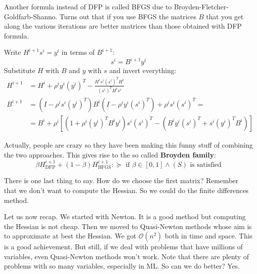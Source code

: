 \par Another formula instead of DFP is called BFGS due to Broyden-Fletcher-Goldfarb-Shanno. Turns out that if you use BFGS the matrices $B$ that you get along the various iterations are better matrices than those obtained with DFP formula.
\par Write $H^{i+1} s^i = y^i$ in terms of $B^{i+1}$:
\begin{equation}
    s^i = B^{i+1} y^i
\end{equation}
Substitute $H$ with $B$ and $y$ with $s$ and invert everything:
\begin{align}
    H^{i+1} &= H^i + \rho^i y^i (y^i)^T - \frac{H^i s^i (s^i)^T H^i}{(s^i)^T H^i s^i}\\
    B^{i+1} &= (I - \rho^i s^i (y^i)^T) B^i (I - \rho^i y^i (s^i)^T) + \rho^i s^i (s^i)^T =\\
    &=B^i + \rho^i [(1 + \rho^i (y^i)^T B^i y^i) s^i (s^i)^T - (B^i y^i (s^i)^T + s^i (y^i)^T B^i)]
\end{align}
\par Actually, people are crazy so they have been making this funny stuff of combining the two approaches. This gives rise to the so called \textbf{Broyden family}:
\begin{equation}
    \beta H_{\text{DFP}}^{i+1} + (1 - \beta) H_{\text{BFGS}}^{i+1} : \succeq \mbox{ if } \beta \in [0,1] \wedge (S) \mbox{ is satisfied}
\end{equation}
\par There is one last thing to say. How do we choose the first matrix? Remember that we don't want to compute the Hessian. So we could do the finite differences method.
\par Let us now recap. We started with Newton. It is a good method but computing the Hessian is not cheap. Then we moved to Quasi-Newton methods whose aim is to approximate at best the Hessian. We got $\mathcal{O}(n^2)$ both in time and space. This is a good achievement. But still, if we deal with problems that have millions of variables, even Quasi-Newton methods won't work. Note that there are plenty of problems with so many variables, especially in ML. So can we do better? Yes.
%
%
%
